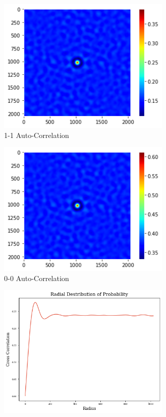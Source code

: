 \documentclass[12pt, a4paper]{report}
\begin{document}
\begin{figure}[H]
\begin{subfigure}{.45\textwidth}
  \includegraphics[width=0.9\textwidth]{Pictures/2 Point/2_point_stats_ww.jpeg}
  \caption{1-1 Auto-Correlation}
  \label{img:microstrImg}
\end{subfigure}
\begin{subfigure}{.45\textwidth}
  \centering
  \includegraphics[width=0.9\textwidth]{Pictures/2 Point/2_point_stats_bb.jpeg}
  \caption{0-0 Auto-Correlation}
  \label{img:microstrImg}
\end{subfigure}
\begin{subfigure}{.45\textwidth}
  \centering
  \includegraphics[width=0.9\textwidth]{Pictures/2 Point/2_point_stats_radial.jpeg}

\end{subfigure}
\end{figure}
\end{document}
